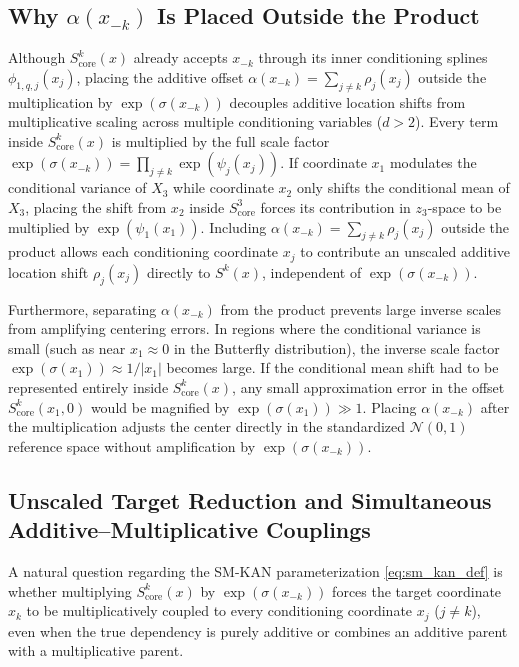 \subsection{Why \texorpdfstring{$\alpha(x_{-k})$}{alpha(x\_\{-k\})} Is Placed Outside the Product}
Although $S^k_{\text{core}}(x)$ already accepts $x_{-k}$ through its inner conditioning splines $\phi_{1, q, j}(x_j)$, placing the additive offset $\alpha(x_{-k}) = \sum_{j \neq k} \rho_j(x_j)$ outside the multiplication by $\exp(\sigma(x_{-k}))$ decouples additive location shifts from multiplicative scaling across multiple conditioning variables ($d > 2$). Every term inside $S^k_{\text{core}}(x)$ is multiplied by the full scale factor $\exp(\sigma(x_{-k})) = \prod_{j \neq k} \exp(\psi_j(x_j))$. If coordinate $x_1$ modulates the conditional variance of $X_3$ while coordinate $x_2$ only shifts the conditional mean of $X_3$, placing the shift from $x_2$ inside $S^3_{\text{core}}$ forces its contribution in $z_3$-space to be multiplied by $\exp(\psi_1(x_1))$. Including $\alpha(x_{-k}) = \sum_{j \neq k} \rho_j(x_j)$ outside the product allows each conditioning coordinate $x_j$ to contribute an unscaled additive location shift $\rho_j(x_j)$ directly to $S^k(x)$, independent of $\exp(\sigma(x_{-k}))$.

Furthermore, separating $\alpha(x_{-k})$ from the product prevents large inverse scales from amplifying centering errors. In regions where the conditional variance is small (such as near $x_1 \approx 0$ in the Butterfly distribution), the inverse scale factor $\exp(\sigma(x_1)) \approx 1/|x_1|$ becomes large. If the conditional mean shift had to be represented entirely inside $S^k_{\text{core}}(x)$, any small approximation error in the offset $S^k_{\text{core}}(x_1, 0)$ would be magnified by $\exp(\sigma(x_1)) \gg 1$. Placing $\alpha(x_{-k})$ after the multiplication adjusts the center directly in the standardized $\mathcal{N}(0, 1)$ reference space without amplification by $\exp(\sigma(x_{-k}))$.

\subsection{Unscaled Target Reduction and Simultaneous Additive--Multiplicative Couplings}
A natural question regarding the SM-KAN parameterization \eqref{eq:sm_kan_def} is whether multiplying $S^k_{\text{core}}(x)$ by $\exp(\sigma(x_{-k}))$ forces the target coordinate $x_k$ to be multiplicatively coupled to every conditioning coordinate $x_j$ ($j \neq k$), even when the true dependency is purely additive or combines an additive parent with a multiplicative parent.

